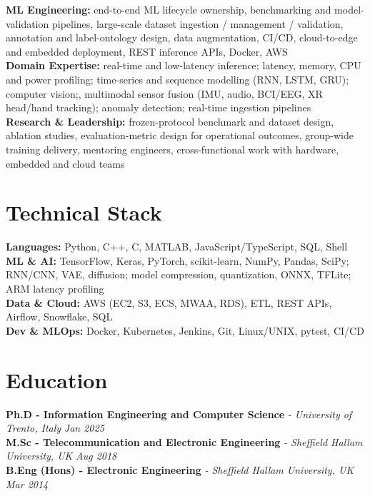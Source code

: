 \documentclass[11pt]{article}
\begin{document}
\textbf{ML Engineering:} end-to-end ML lifecycle ownership, benchmarking and model-validation pipelines, large-scale dataset ingestion / management / validation, annotation and label-ontology design, data augmentation, CI/CD, cloud-to-edge and embedded deployment, REST inference APIs, Docker, AWS\\
\textbf{Domain Expertise:} real-time and low-latency inference; latency, memory, CPU and power profiling; time-series and sequence modelling (RNN, LSTM, GRU); computer vision;, multimodal sensor fusion (IMU, audio, BCI/EEG, XR head/hand tracking); anomaly detection; real-time ingestion pipelines\\
\textbf{Research \& Leadership:} frozen-protocol benchmark and dataset design, ablation studies, evaluation-metric design for operational outcomes, group-wide training delivery, mentoring engineers, cross-functional work with hardware, embedded and cloud teams

\section*{Technical Stack}

\textbf{Languages:} Python, C++, C, MATLAB, JavaScript/TypeScript, SQL, Shell\\
\textbf{ML \& AI:} TensorFlow, Keras, PyTorch, scikit-learn, NumPy, Pandas, SciPy; RNN/CNN, VAE, diffusion; model compression, quantization, ONNX, TFLite; ARM latency profiling\\
\textbf{Data \& Cloud:} AWS (EC2, S3, ECS, MWAA, RDS), ETL, REST APIs, Airflow, Snowflake, SQL\\
\textbf{Dev \& MLOps:} Docker, Kubernetes, Jenkins, Git, Linux/UNIX, pytest, CI/CD

\section*{Education}
\textbf{Ph.D - Information Engineering and Computer Science} \textit{\small{ - University of Trento, Italy}} \hfill \textit{Jan 2025}\\[3pt]
\noindent\textbf{M.Sc - Telecommunication and Electronic Engineering} \textit{\small{ - Sheffield Hallam University, UK}} \hfill \textit{Aug 2018}\\[3pt]
\noindent\textbf{B.Eng (Hons) - Electronic Engineering} \textit{\small{ - Sheffield Hallam University, UK}} \hfill \textit{Mar 2014}
\end{document}
